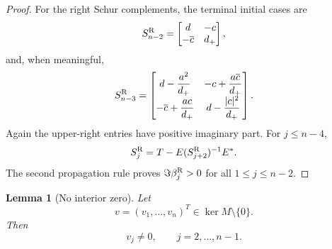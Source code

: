 \documentclass[11pt]{amsart}
\numberwithin{equation}{section}
\newtheorem{lemma}[theorem]{Lemma}
\begin{document}
\begin{proof}
For the right Schur complements, the terminal initial cases are
\[
S_{n-2}^{\rm R}
=
\begin{bmatrix}
d & -c\\
-\overline c & d_+
\end{bmatrix},
\]
and, when meaningful,
\[
S_{n-3}^{\rm R}
=
\begin{bmatrix}
d-\dfrac{a^2}{d_+}
&
-c+\dfrac{a\overline c}{d_+}
\\[2mm]
-\overline c+\dfrac{ac}{d_+}
&
d-\dfrac{|c|^2}{d_+}
\end{bmatrix}.
\]
Again the upper-right entries have positive imaginary part.  For \(j\le n-4\),
\[
S_j^{\rm R}
=
T-E(S_{j+2}^{\rm R})^{-1}E^*.
\]
The second propagation rule proves \(\Im\beta_j^{\rm R}>0\) for all \(1\le j\le n-2\).
\end{proof}

\begin{lemma}[No interior zero]\label{lem:no-interior-zero}
Let
\[
v=(v_1,\dots,v_n)^T\in\ker M\setminus\{0\}.
\]
Then
\[
v_j\ne0,
\qquad
j=2,\dots,n-1.
\]
\end{lemma}
\end{document}

